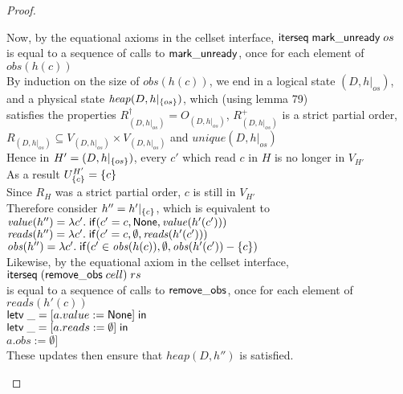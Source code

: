 \begin{proof}
\begin{tabbedproof}
\oooo Now, by the equational axioms in the cellset interface, $\mathsf{iterseq\;mark\_unready}\;os$ \\
\ooox is equal to a sequence of calls to $\mathsf{mark\_unready}$, once for each element of $\mathit{obs}(h(c))$\\
\oooo By induction on the size of $\mathit{obs}(h(c))$, we end in a logical state $(D, h|_{os})$, \\
\ooox and a physical state $\mathit{heap}(D, h|_{\{{os}\}})$, which (using lemma 79)  \\
\ooox satisfies the properties $R^\dagger_{(D,h|_{os})} = O_{(D,h|_{os})}$, $R^+_{(D,h|_{os})}$ is a strict partial order, \\
\ooox $R_{(D,h|_{os})} \subseteq V_{(D,h|_{os})} \times V_{(D,h|_{os})}$ and $\mathit{unique}(D,h|_{os})$ \\
\oooo Hence in $H' = (D,h|_{\{{os}\}})$, every $c'$ which read $c$ in $H$ is no longer in $V_{H'}$ \\ 
\oooo As a result $U^{H'}_{\{{c}\}} = \{{c}\}$ \\ 
\oooo Since $R_H$ was a strict partial order, $c$ is still in $V_{H'}$ \\
\oooo Therefore consider $h'' = h'|_{\{{c}\}}$, which is equivalent to   \\
\oooox $\mathit{value}(h'') = \lambda c'.\;\mathsf{if}({c' = c}, {\mathsf{None}}, {\mathit{value}(h'(c'))})$ \\
\oooox $\mathit{reads}(h'') = \lambda c'.\;\mathsf{if}({c' = c}, {\emptyset}, {\mathit{reads}(h'(c'))})$ \\
\oooox $\mathit{obs}(h'') = \lambda c'.\;\mathsf{if}({c'\in \mathit{obs}(h(c))}, {\emptyset}, {\mathit{obs}(h'(c')) - \{{c}\}})$ \\
\oooo Likewise, by the equational axiom in the cellset interface, $\mathsf{iterseq}\;(\mathsf{remove\_obs}\;cell)\;rs$ \\
\ooox is equal to a sequence of calls to $\mathsf{remove\_obs}$, once for each element of $\mathit{reads}(h'(c))$\\
\oooo $\mathsf{letv}\;\_ = [a.value := \mathsf{None}]\;\mathsf{in}\;$ \\
\oooo $\mathsf{letv}\;\_ = [a.reads := \emptyset]\;\mathsf{in}\;$ \\
\oooo $a.obs := \emptyset]$ \\
\oooo These updates then ensure that $\mathit{heap}(D, h'')$ is satisfied. \\
\end{tabbedproof}
\end{proof}

